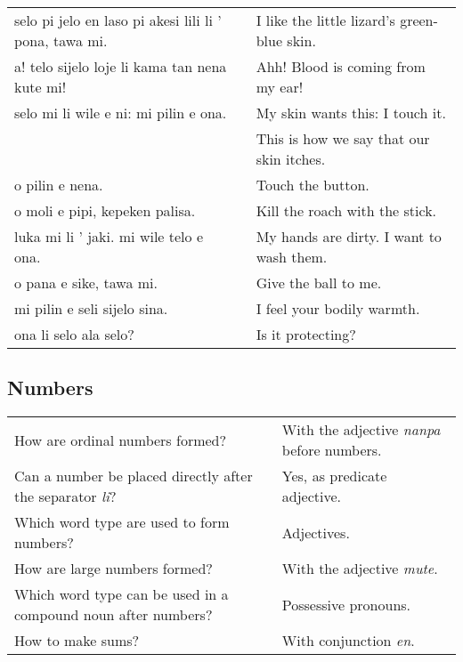 \begin{supertabular}{p{5,5cm}|ll}
    selo pi jelo en laso pi akesi lili li ' pona, tawa mi. &  & I like the little lizard's green-blue skin. \\
    a! telo sijelo loje li kama tan nena kute mi!          &  & Ahh! Blood is coming from my ear!           \\
    selo mi li wile e ni: mi pilin e ona.                  &  & My skin wants this: I touch it.             \\
                                                           &  & This is how we say that our skin itches.    \\
    o pilin e nena.                                        &  & Touch the button.                           \\
    o moli e pipi, kepeken palisa.                         &  & Kill the roach with the stick.              \\
    luka mi li ' jaki. mi wile telo e ona.                 &  & My hands are dirty. I want to wash them.    \\
    o pana e sike, tawa mi.                                &  & Give the ball to me.                        \\
    mi pilin e seli sijelo sina.                           &  & I feel your bodily warmth.                  \\
    ona li selo ala selo?                                  &  & Is it protecting?                           \\
\end{supertabular}

\newpage

\subsection*{Numbers}
\label{'numbers'}

\begin{supertabular}{p{5,5cm}|ll}
    How are ordinal numbers formed?                                  &  & With the adjective \textit{nanpa} before numbers. \\
    Can a number be placed directly after the separator \textit{li}? &  & Yes, as predicate adjective.                      \\
    Which word type are used to form numbers?                        &  & Adjectives.                                       \\
    How are large numbers formed?                                    &  & With the adjective \textit{mute}.                 \\
    Which word type can be used in a compound noun after numbers?    &  & Possessive pronouns.                              \\
    How to make sums?                                                &  & With conjunction \textit{en}.                     \\
\end{supertabular}

